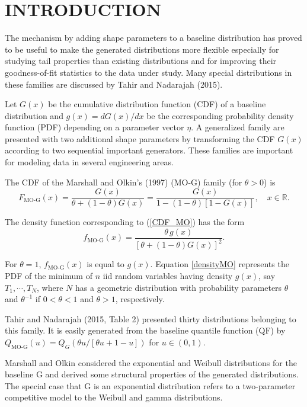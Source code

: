 \documentclass[twoside,leqno,11pt]{article}
\begin{document}
\section{INTRODUCTION}

The mechanism by adding shape parameters to a baseline distribution has
proved to be useful to make the generated distributions more flexible especially for studying tail
properties than existing distributions and for improving their goodness-of-fit statistics
to the data under study. Many special distributions in these families are discussed by Tahir
and Nadarajah (2015).

Let $G(x)$ be the cumulative distribution function (CDF) of a
baseline distribution and $g(x)=dG(x)/dx$ be the corresponding  probability density function (PDF) depending on a
parameter vector $\eta$. A generalized family are presented
with two additional shape parameters by transforming the CDF $G(x)$
according to two sequential important gene\-rators. These families are important for modeling data
in several engineering areas. 


The CDF of the Marshall and Olkin's (1997) ($\text{MO-G}$) family (for $\theta>0$) is
\begin{equation}\label{CDF_MO}
F_{\text{MO-G}}(x)=\frac{G(x)}{\theta+(1-\theta)G(x)}=\frac{G(x)}{1-(1-\theta)[1-G(x)]},\quad x \in \mathbb{R}.
\end{equation}

The density function corresponding to (\ref{CDF_MO}) has the form
\begin{equation}\label{densityMO}
f_{\text{MO-G}}(x)=\frac{\theta\, g(x)}{[\theta+(1-\theta)G(x)]^{2}}.
\end{equation}

For $\theta=1$, $f_{\text{MO-G}}(x)$ is equal to $g(x)$. 
Equation \eqref{densityMO} represents the PDF of the minimum of $n$ iid random variables having density $g(x)$, say $T_1,\cdots,T_N$, 
where $N$ has a geometric distribution with probability parameters $\theta$ and $\theta^{-1}$ if $0<\theta<1$ and $\theta>1$, 
respectively.

Tahir and Nadarajah (2015, Table 2) presented thirty distributions
belonging to this family. It is easily generated from the baseline quantile function (QF) by
$Q_{\text{MO-G}}(u)=Q_{G}\left(\theta u / \left[\theta u+1-u\right]\right)$ for $u\in(0,1)$.

Marshall and Olkin considered the exponential and Weibull distributions for the baseline G and derived some
structural properties of the generated distributions. The special case that G is an exponential distribution
refers to a two-parameter competitive model to the Weibull and gamma distributions.
\end{document}
